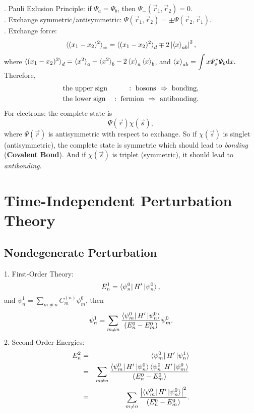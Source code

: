 \documentclass[12pt, 
]{article}
\begin{document}
. Pauli Exlusion Principle: if $\varPsi_a=\varPsi_b$, then $\varPsi_{-}(\vec{r}_1,\vec{r}_2)=0$.\\

. Exchange symmetric/antisymmetric: $\varPsi(\vec{r}_1,\vec{r}_2)=\pm\varPsi(\vec{r}_2,\vec{r}_1)$.\\

. Exchange force:
\[
	\braket{(x_1-x_2)^2}_\pm=\braket{(x_1-x_2)^2}_d\mp 2\left|\braket{x}_{ab}\right|^2,
\]
where $\braket{(x_1-x_2)^2}_d=\braket{x^2}_a+\braket{x^2}_b-2\braket{x}_a\braket{x}_b$, and $\displaystyle\braket{x}_{ab}=\int x\varPsi_a^*\varPsi_b{\rm d}x.$ Therefore, 
\begin{eqnarray*}
	 &\rm the~upper~sign&\rm :~bosons~\Rightarrow~bonding,\\
	 &\rm the~lower~sign&\rm :~fermion~\Rightarrow~antibonding.
\end{eqnarray*}
For electrons: the complete state is
\[
	\varPsi(\vec{r})\chi(\vec{s}),
\]
where $\varPsi(\vec{r})$ is antisymmetric with respect to exchange. So if $\chi(\vec{s})$ is singlet (antisymmetric), the complete state is symmetric which should lead to {\it bonding} ({\bf Covalent Bond}). And if $\chi(\vec{s})$ is triplet (symmetric), it should lead to {\it antibonding}.
\newpage

\section{Time-Independent Perturbation Theory}
\subsection{Nondegenerate Perturbation}
1. First-Order Theory:
\begin{equation}\label{eq:24}
	E^1_n=\bra{\psi_n^0}H'\ket{\psi_n^0},
\end{equation}
and $\psi^1_n=\sum_{m\neq n}C_m^{(n)}\psi_m^0$, then
\[
	\psi^1_n=\sum_{m\neq n}\frac{\bra{\psi_m^0}H'\ket{\psi_n^0}}{(E_n^0-E_m^0)}\psi_m^0.
\]
2. Second-Order Energies:
\begin{eqnarray*}
	E_n^2&=&\bra{\psi_m^0}H'\ket{\psi_n^1}\\
	&=&\sum_{m\neq n}\frac{\bra{\psi_m^0}H'\ket{\psi_n^0}\bra{\psi_n^0}H'\ket{\psi_m^0}}{(E_n^0-E_m^0)}\\
	&=&\sum_{m\neq n}\frac{\left|\bra{\psi_m^0}H'\ket{\psi_n^0}\right|^2}{(E_n^0-E_m^0)}.
\end{eqnarray*}
\end{document}
